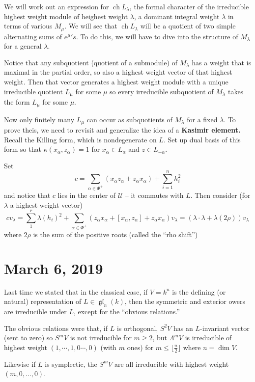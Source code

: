 \documentclass[12pt]{article}
\theoremstyle{nonumberbreak}
\theoremstyle{changebreak}
\theoremstyle{nonumberbreak}
\theoremstyle{change}
\DeclareMathOperator{\ch}{ch}
\DeclareMathOperator{\gl}{\mathfrak{gl}}
\begin{document}
We will work out an expression for $\ch L_\lambda$, the formal character of the irreducible highest weight module of heighest weight $\lambda$, a dominant integral weight $\lambda$
in terms of various $M_\mu$. We will see that $\ch L_\lambda$ will be a quotient of two simple alternating sums of ${e^\mu}'s$. To do this, we will have to dive into the structure of $M_\lambda$
for a general $\lambda$.

Notice that any subquotient (quotient of a submodule) of $M_\lambda$ has a weight that is maximal in the partial order, so also a highest weight vector of that highest weight. 
Then that vector generates a highest weight module with a unique irreducible quotient $L_\mu$ for some $\mu$ so every irreducible subquotient 
of $M_\lambda$ takes the form $L_\mu$ for some $\mu$.

Now only finitely many $L_\mu$ can occur as subquotients of $M_\lambda$ for a fixed $\lambda$. 
To prove theis, we need to revisit and generalize the idea of a \textbf{Kasimir element.} Recall the Killing form,
which is nondegenerate on $L$. Set up dual basis of this form so that $\kappa(x_\alpha,z_\alpha)=1$ for $x_\alpha\in L_\alpha$ and $z\in L_{-\alpha}$.

Set
\[c=\sum_{\alpha\in\Phi^+}(x_\alpha z_\alpha+z_\alpha x_\alpha)+\sum_{i=1}^nh_i^2\]
and notice that $c$ lies in the center of $\mathcal U$ -- it commutes with $L$. Then consider 
(for $\lambda$ a highest weight vector)
\[c v_\lambda=\sum_1^r\lambda(h_i)^2+\sum_{\alpha\in\Phi^+}(z_\alpha x_\alpha+[x_\alpha,z_\alpha]+z_\alpha x_\alpha)v_\lambda=(\lambda\cdot \lambda+\lambda(2\rho))v_\lambda\]
where $2\rho$ is the sum of the positive roots (called the ``rho shift'')

\section{March 6, 2019}
Last time we stated that in the classical case, if $V=k^n$ is the defining (or natural) representation of
$L\in\gl_n(k)$, then the symmetric and exterior owers are irreducible under $L$, except for the ``obvious relations.''

The obvious relations were that, if $L$ is orthogonal, $S^2V$ has an $L$-invariant vector (sent to zero)
so $S^mV$ is not irreducible for $m\ge 2$, but $\Lambda^mV$ is irreducible of highest weight $(1,\cdots,1,0\cdots,0)$  (with $m$ ones)
for $m\le\lfloor\frac{n}{2}\rfloor$ where $n=\dim V$.

Likewise if $L$ is symplectic, the $S^mV$ are all irreducible with highest weight $(m,0,\dots,0)$.
\end{document}
